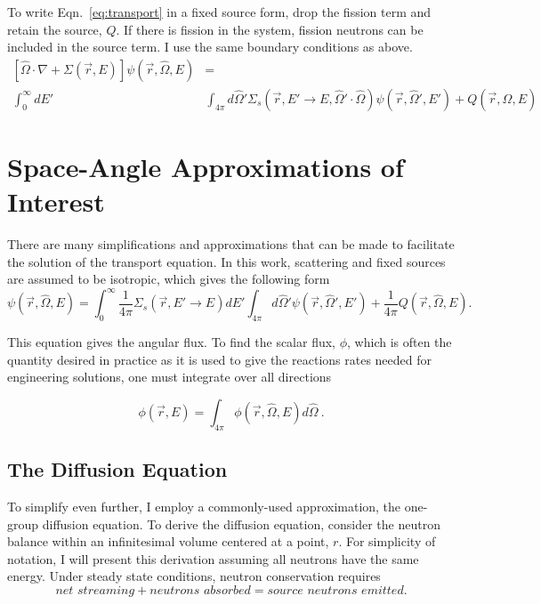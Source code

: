 To write Eqn.~\eqref{eq:transport} in a fixed source form, drop the fission term and retain the source, $Q$. If there is fission in the system, fission neutrons can be included in the source term. I use the same boundary conditions as above. 
%
\begin{equation}
\begin{split}
 [\hat{\Omega} \cdot \nabla + \Sigma(\vec{r}, E)]\psi(\vec{r}, \hat{\Omega}, E) &= \\ \int_0^\infty dE' &\int_{4\pi} d\hat{\Omega}' \Sigma_s(\vec{r}, E' \rightarrow E, \hat{\Omega}' \cdot \hat{\Omega})\psi(\vec{r}, \hat{\Omega}', E')  + Q(\vec{r}, \hat{\Omega}, E)
\end{split}
 \label{eq:transport_fixed_source}
\end{equation}



\section{Space-Angle Approximations of Interest}
There are many simplifications and approximations that can be made to facilitate the solution of the transport equation. In this work, scattering and fixed sources are assumed to be isotropic, which gives the following form
%
\begin{equation}
[\hat{\Omega} \cdot \nabla + \Sigma_t(\vec{r}, E)] \psi(\vec{r}, \hat{\Omega}, E) =   \int_0^\infty \frac{1}{4\pi} \Sigma_s(\vec{r}, E' \rightarrow E)  dE' \int_{4\pi} d\hat{\Omega}'\psi(\vec{r}, \hat{\Omega}', E')  + \frac{1}{4\pi}Q(\vec{r}, \hat{\Omega}, E) .

 \label{eq:transport_isotropic_scattering}
\end{equation}

This equation gives the angular flux. To find the scalar flux, $\phi$, which is often the quantity desired in practice as it is used to give the reactions rates needed for engineering solutions, one must integrate over all directions

\begin{equation}
  \phi(\vec{r}, E) = \int_{4\pi} \phi(\vec{r}, \hat{\Omega}, E) d \hat{\Omega}\:.
\end{equation}


\subsection{The Diffusion Equation}
To simplify even further, I employ a commonly-used approximation, the one-group diffusion equation. To derive the diffusion equation, consider the neutron balance within an infinitesimal volume centered at a point, $r$. For simplicity of notation, I will present this derivation assuming all neutrons have the same energy. Under steady state conditions, neutron conservation requires
%
\begin{equation}
    \textit{net streaming} + \textit{neutrons absorbed} = \textit{source neutrons emitted}.
\end{equation}

